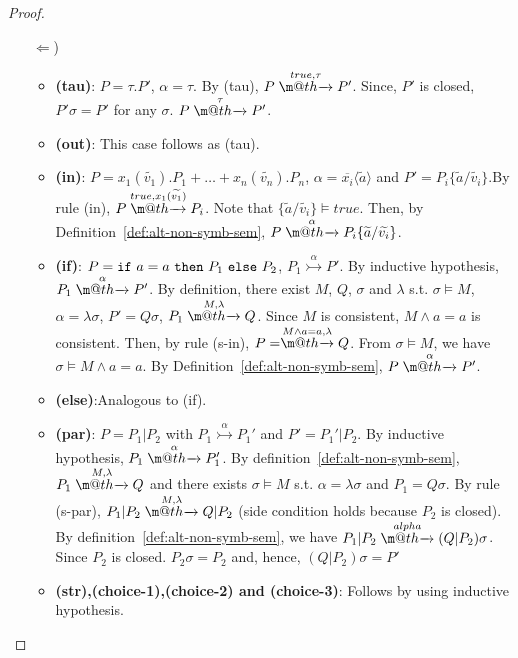 \documentclass[submission,copyright,creativecommons]{eptcs}
\makeatletter
\newcommand{\outp}[2]{\overline{#1}\langle{#2}\rangle}
\newcommand{\inp}[2]{#1(#2)}
\newcommand{\ifte}[3]{{\tt if}\ #1\ {\tt then }\ #2\ {\tt else }\ #3}
\newcommand{\tuple}[1]{\widetilde{#1}}
\newcommand{\tr}[1]{\stackrel{#1}{\rightarrowfill}}
\newcommand{\tra}[1]{\stackrel{#1}{\rightarrowtail}}
\def \rightarrowfill{\m@th\mathord{\smash-}\mkern-6mu\cleaders\hbox{$\mkern-2mu\mathord{\smash-}\mkern-2mu$}\hfill
  \mkern-6mu\mathord\rightarrow}
\makeatother
\begin{document}
\begin{proof}
\begin{itemize}
       
    
    \item[$\Leftarrow$)] 
       \begin{itemize}
          \item {\bf({\sc tau})}: $P= \tau.P'$, $\alpha = \tau$. By ({\sc tau}), $P\tr{true, \tau} P'$. Since, $P'$ is closed, $P'\sigma = P'$ for any $\sigma$.
          $P\tr{\tau} P'$.
          \item {\bf({\sc out})}: This case follows as ({\sc tau}).
          \item {\bf({\sc in})}: $P={\inp{x_1}{\tuple{v_1}}.P_1+ \ldots+\inp{x_n}{\tuple{v_n}}.P_n}$, $\alpha = \outp{x_i}{\tuple{a}}$ and $P'= P_i \{\tuple{a}/\tuple{v_i}\}$.By rule ({\sc in}), $P\tr{true,{\inp{x_1}{\tuple{v_1}}}} P_i$. Note that $\{\tuple{a}/\tuple{v_i}\} \models true$. Then, by Definition~\ref{def:alt-non-symb-sem}, $P\tr{\alpha} P_i\{\tuple{a}/\tuple{v_i}\}$.
          \item {\bf({\sc if})}: $P = \ifte{a=a} {P_1}{P_2}$, $P_1\tra{\alpha} P'$. By
          inductive hypothesis, $P_1\tr{\alpha} P'$. By definition, there exist 
          $M$, $Q$, $\sigma$ and $\lambda$ s.t. $\sigma\models M$, $\alpha = \lambda\sigma$, $P' = Q\sigma$, $P_1 \tr{M, \lambda} Q$. Since $M$ is consistent,
          $M\wedge a=a$ is consistent. Then, by rule ({\sc s-in}), $P = \tr{M\wedge a=a, \lambda} Q$. From $\sigma \models M$, we have $\sigma \models M\wedge a=a$. By Definition~\ref{def:alt-non-symb-sem}, $P\tr{\alpha} P'$.  
          \item {\bf({\sc else})}:Analogous to ({\sc if}).
          \item {\bf({\sc par})}: $P =P_1|P_2$ with $P_1\tra{\alpha} P_1'$ and $P' = P_1'|P_2$. By inductive hypothesis, $P_1\tr{\alpha} P_1'$.
          By definition~\ref{def:alt-non-symb-sem}, $P_1\tr{M,\lambda} Q$ and there exists $\sigma\models M$ s.t. $\alpha = \lambda\sigma$ and 
          $P_1 = Q\sigma$. By rule ({\sc s-par}), $P_1|P_2\tr{M,\lambda} Q|P_2$ (side condition holds because $P_2$ is closed). By definition~\ref{def:alt-non-symb-sem}, we have $P_1|P_2\tr{alpha} (Q|P_2)\sigma$. Since $P_2$ is closed. $P_2\sigma = P_2$ and, hence, 
          $(Q|P_2)\sigma = P'$
          \item {\bf({\sc str}),\bf({\sc choice-1}),\bf({\sc choice-2}) and \bf({\sc choice-3})}: Follows by using inductive hypothesis. 
       \end{itemize}

  \end{itemize}
\end{proof}
\end{document}
